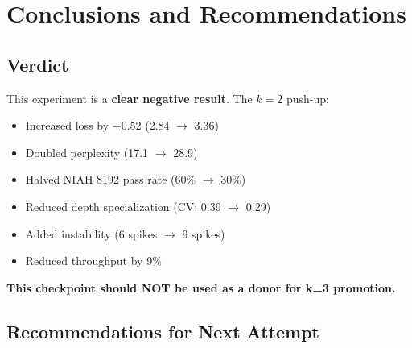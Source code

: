 \documentclass[11pt,a4paper]{article}
\begin{document}
\section{Conclusions and Recommendations}

\subsection{Verdict}

This experiment is a \textbf{clear negative result}. The $k{=}2$ push-up:
\begin{itemize}[topsep=4pt, itemsep=2pt]
    \item[$\times$] Increased loss by +0.52 (2.84 $\to$ 3.36)
    \item[$\times$] Doubled perplexity (17.1 $\to$ 28.9)
    \item[$\times$] Halved NIAH 8192 pass rate (60\% $\to$ 30\%)
    \item[$\times$] Reduced depth specialization (CV: 0.39 $\to$ 0.29)
    \item[$\times$] Added instability (6 spikes $\to$ 9 spikes)
    \item[$\times$] Reduced throughput by 9\%
\end{itemize}

\noindent \textbf{This checkpoint should NOT be used as a donor for k=3 promotion.}

\subsection{Recommendations for Next Attempt}
\end{document}
